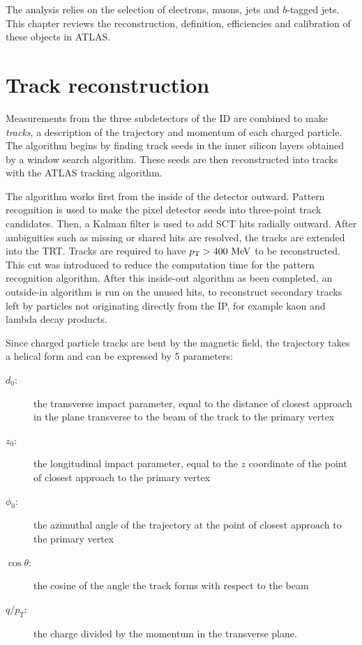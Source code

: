 
The analysis relies on the selection of electrons, muons, jets and $b$-tagged jets. This chapter reviews the reconstruction, definition, efficiencies and calibration of these objects in ATLAS.
\section{Track reconstruction}
Measurements from the three subdetectors of the ID are combined to make \emph{tracks}, a description of the trajectory and momentum of each charged particle. The algorithm begins by finding track seeds in the inner silicon layers obtained by a window search algorithm. These seeds are then reconstructed into tracks with the ATLAS tracking algorithm\cite{ATLAS-CONF-2012-042}.

The algorithm works first from the inside of the detector outward. Pattern recognition is used to make the pixel detector seeds into three-point track candidates. Then, a Kalman filter is used to add SCT hits radially outward. After ambiguities such as missing or shared hits are resolved, the tracks are extended into the TRT. Tracks are required to have $\pt > 400 \mev$ to be reconstructed. This cut was introduced to reduce the computation time for the pattern recognition algorithm. After this inside-out algorithm as been completed, an outside-in algorithm is run on the unused hits, to reconstruct secondary tracks left by particles not originating directly from the IP, for example kaon and lambda decay products.

Since charged particle tracks are bent by the magnetic field, the trajectory takes a helical form and can be expressed by 5 parameters: 
\begin{description}
\item[$d_0$:] the transverse impact parameter, equal to the distance of closest approach in the plane transverse to the beam of the track to the primary vertex
\item[$z_0$:] the longitudinal impact parameter, equal to the $z$ coordinate of the point of closest approach to the primary vertex
\item[$\phi_0$:] the azimuthal angle of the trajectory at the point of closest approach to the primary vertex
\item[$\cos\theta$:] the cosine of the angle the track forms with respect to the beam
\item[$q/p_T$:] the charge divided by the momentum in the transverse plane.
\end{description}



